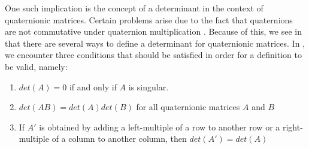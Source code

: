 One such implication is the concept of a determinant in the context of quaternionic matrices. Certain problems arise due to the fact that quaternions are not commutative under quaternion multiplication \cite{aslaksen}. Because of this, we see in \cite{aslaksen} that there are several ways to define a determinant for quaternionic matrices. In \cite{aslaksen}, we encounter three conditions that should be satisfied in order for a definition to be valid, namely:
\begin{enumerate}
	\item $det(A) = 0$ if and only if $A$ is singular.
	\item $det(AB) = det(A)det(B)$ for all quaternionic matrices $A$ and $B$
	\item If $A'$ is obtained by adding a left-multiple of a row to another row or a right-multiple of a column to another column, then $det(A')=det(A)$
\end{enumerate}

